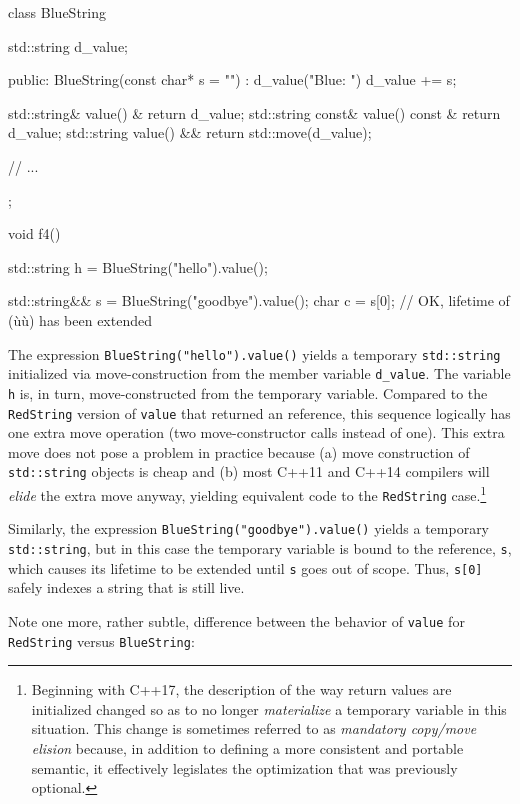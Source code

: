 \begin{emcppslisting}[emcppsbatch=e3]
class BlueString
{
   std::string d_value;

public:
    BlueString(const char* s = "") : d_value("Blue: ") { d_value += s; }

    std::string&        value() &       { return d_value; }
    std::string const&  value() const & { return d_value; }
    std::string         value() &&      { return std::move(d_value); }

    // ...
};

void f4()
{
    std::string h = BlueString("hello").value();

    std::string&& s = BlueString("goodbye").value();
    char c = s[0];  // OK, lifetime of (ù{}ù) has been extended
}
\end{emcppslisting}
    

\noindent The expression \lstinline!BlueString("hello").value()! yields a temporary
\lstinline!std::string! initialized via move-construction from the member
variable \lstinline!d_value!. The variable \lstinline!h! is, in turn,
move-constructed from the temporary variable. Compared to the
\lstinline!RedString! version of \lstinline!value! that returned an
 reference, this sequence logically has one extra move
operation (two move-constructor calls instead of one). This extra move
does not pose a problem in practice because (a) move construction of
\lstinline!std::string! objects is cheap and (b) most C++11 and C++14
compilers will \emph{elide} the extra move anyway, yielding equivalent
code to the \lstinline!RedString! case.{\cprotect\footnote{Beginning with
C++17, the description of the way return values are initialized
changed so as to no longer \emph{materialize} a temporary variable in
this situation. This change is sometimes referred to as
\emph{mandatory copy/move elision} because, in addition to defining a
more consistent and portable semantic, it effectively legislates the
  optimization that was previously optional.}}

Similarly, the expression \lstinline!BlueString("goodbye").value()! yields
a temporary \lstinline!std::string!, but in this case the temporary
variable is bound to the reference, \lstinline!s!, which causes its
lifetime to be extended until \lstinline!s! goes out of scope. Thus,
\lstinline!s[0]! safely indexes a string that is still live.

Note one more, rather subtle, difference between the behavior of
\lstinline!value! for \lstinline!RedString! versus \lstinline!BlueString!:

